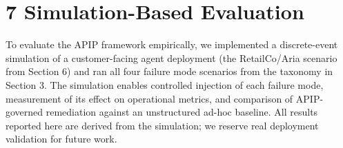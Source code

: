 \section{7  Simulation-Based Evaluation}

To evaluate the APIP framework empirically, we implemented a discrete-event simulation of a customer-facing agent deployment (the RetailCo/Aria scenario from Section 6) and ran all four failure mode scenarios from the taxonomy in Section 3. The simulation enables controlled injection of each failure mode, measurement of its effect on operational metrics, and comparison of APIP-governed remediation against an unstructured ad-hoc baseline. All results reported here are derived from the simulation; we reserve real deployment validation for future work.

